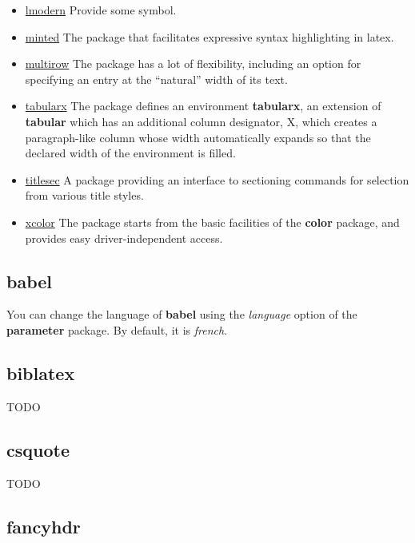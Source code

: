 \documentclass[a4paper, 11pt]{article}
\begin{document}
\begin{itemize}
    \item \href{https://www.ctan.org/tex-archive/info/lmodern}{lmodern} Provide some symbol.
    \item \href{https://www.ctan.org/pkg/minted}{minted} The package that facilitates expressive syntax highlighting in \gls{latex}.
    \item \href{https://www.ctan.org/pkg/multirow}{multirow} The package has a lot of flexibility, including an option for specifying
          an entry at the “natural” width of its text.
    \item \href{https://www.ctan.org/pkg/tabularx}{tabularx} The package defines an environment \textbf{tabularx}, an extension of
          \textbf{tabular} which has an additional column designator, X, which creates a paragraph-like column whose width automatically
          expands so that the declared width of the environment is filled.
    \item \href{https://www.ctan.org/pkg/titlesec}{titlesec} A package providing an interface to sectioning commands for selection
          from various title styles.
    \item \href{https://www.ctan.org/pkg/xcolor}{xcolor} The package starts from the basic facilities of the \textbf{color} package,
          and provides easy driver-independent access.
\end{itemize}

\subsection{babel}

You can change the language of \textbf{babel} using the \textit{language} option of the \textbf{\gls{parameter}} package. By default, it
is \textit{french}.

\subsection{biblatex}

TODO

\subsection{csquote}

TODO

\subsection{fancyhdr}
\end{document}
